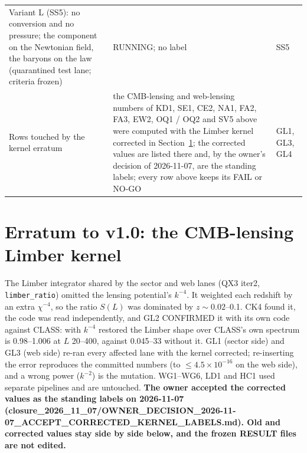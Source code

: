 \documentclass[10pt]{article}
\begin{document}
\begin{longtable}{@{}p{4.4cm}p{8.6cm}p{2.8cm}@{}}
Variant L (SS5): no conversion and no pressure; the component on the Newtonian field, the baryons on the law (quarantined test lane; criteria frozen) & RUNNING; no label & SS5\\
Rows touched by the kernel erratum & the CMB-lensing and web-lensing numbers of KD1, SE1, CE2, NA1, FA2, FA3, EW2, OQ1 / OQ2 and SV5 above were computed with the Limber kernel corrected in Section~\ref{sec:erratum}; the corrected values are listed there and, by the owner's decision of 2026-11-07, are the standing labels; every row above keeps its FAIL or NO-GO & GL1, GL3, GL4\\
\bottomrule
\end{longtable}
\normalsize

\section{Erratum to v1.0: the CMB-lensing Limber kernel}\label{sec:erratum}
The Limber integrator shared by the sector and web lanes (QX3 iter2, \texttt{limber\_ratio}) omitted the lensing potential's $k^{-4}$. It weighted each redshift by an extra $\chi^{-4}$, so the ratio $S(L)$ was dominated by $z\sim0.02$--0.1. CK4 found it, the code was read independently, and GL2 CONFIRMED it with its own code against CLASS: with $k^{-4}$ restored the Limber shape over CLASS's own spectrum is 0.98--1.006 at $L$ 20--400, against 0.045--33 without it. GL1 (sector side) and GL3 (web side) re-ran every affected lane with the kernel corrected; re-inserting the error reproduces the committed numbers (to $\le4.5\times10^{-16}$ on the web side), and a wrong power ($k^{-2}$) is the mutation. WG1--WG6, LD1 and HC1 used separate pipelines and are untouched. \textbf{The owner accepted the corrected values as the standing labels on 2026-11-07 (closure\_2026\_11\_07/OWNER\_DECISION\_2026-11-07\_ACCEPT\_CORRECTED\_KERNEL\_LABELS.md). Old and corrected values stay side by side below, and the frozen RESULT files are not edited.}
\end{document}
